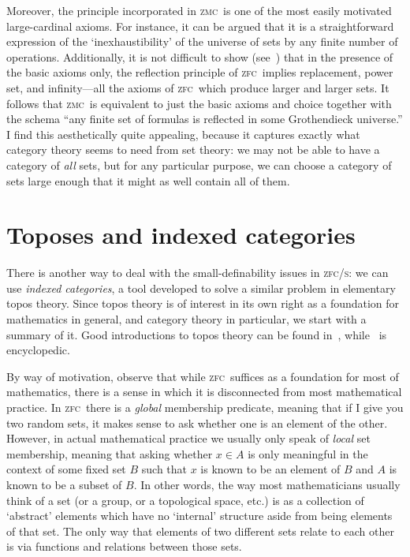 \documentclass{amsart}
\def\zfc{\textsc{zfc}}
\def\zfcs{\textsc{zfc/s}}
\def\zmc{\textsc{zmc}}
\begin{document}
Moreover, the principle incorporated in \zmc\ is one of the most
easily motivated large-cardinal axioms.  For instance, it can be
argued that it is a straightforward expression of the
`inexhaustibility' of the universe of sets by any finite number of
operations.  Additionally, it is not difficult to show
(see~\cite{levy:strong-inf}) that in the presence of the basic axioms
only, the reflection principle of \zfc\ implies replacement, power
set, and infinity---all the axioms of \zfc\ which produce larger and
larger sets.  It follows that \zmc\ is equivalent to just the basic
axioms and choice together with the schema ``any finite set of
formulas is reflected in some Grothendieck universe.''  I find this
aesthetically quite appealing, because it captures exactly what
category theory seems to need from set theory: we may not be able to
have a category of \emph{all} sets, but for any particular purpose, we
can choose a category of sets large enough that it might as well
contain all of them.


\section{Toposes and indexed categories}
\label{sec:topos-indexed}

There is another way to deal with the small-definability issues in
\zfcs: we can use \emph{indexed categories}, a tool developed to solve
a similar problem in elementary topos theory.  Since topos theory is
of interest in its own right as a foundation for mathematics in
general, and category theory in particular, we start with a summary of
it.  Good introductions to topos theory can be found
in~\cite{mm:shv-gl,mclarty:ecat-etop}, while~\cite{ptj:elephant} is
encyclopedic.

By way of motivation, observe that while \zfc\ suffices as a
foundation for most of mathematics, there is a sense in which it is
disconnected from most mathematical practice.  In \zfc\ there is a
\emph{global} membership predicate, meaning that if I give you two
random sets, it makes sense to ask whether one is an element of the
other.  However, in actual mathematical practice we usually only speak
of \emph{local} set membership, meaning that asking whether $x\in A$
is only meaningful in the context of some fixed set $B$ such that $x$
is known to be an element of $B$ and $A$ is known to be a subset of
$B$.  In other words, the way most mathematicians usually think of a
set (or a group, or a topological space, etc.) is as a collection of
`abstract' elements which have no `internal' structure aside from
being elements of that set.  The only way that elements of two
different sets relate to each other is via functions and relations
between those sets.
\end{document}
